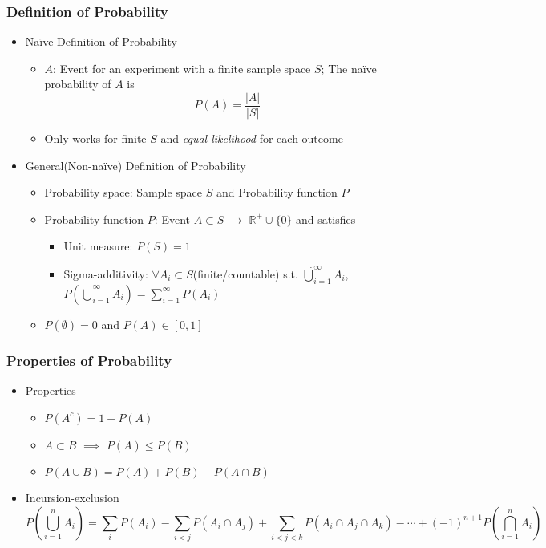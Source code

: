\subsubsection*{Definition of Probability}
\begin{itemize}
    \item Na\"ive Definition of Probability
    \begin{itemize}
        \item $A$: Event for an experiment with a finite sample space $S$; The na\"ive probability of $A$ is
        \begin{equation}
            P(A)=\frac{|A|}{|S|}
        \end{equation}
        \item Only works for finite $S$ and \textit{equal likelihood} for each outcome
    \end{itemize}
    \item General(Non-na\"ive) Definition of Probability
    \begin{itemize}
        \item Probability space: Sample space $S$ and Probability function $P$
        \item Probability function $P$: Event $A\subset S$ $\to$ $\mathbb{R}^+\cup\{0\}$ and satisfies
        \begin{itemize}
            \item Unit measure: $P(S)=1$
            \item Sigma-additivity: $\forall A_i\subset S$(finite/countable) s.t. $\dot\bigcup_{i=1}^\infty A_i$, $P\left(\dot\bigcup_{i=1}^\infty A_i\right)=\sum_{i=1}^\infty P(A_i)$
        \end{itemize}
        \item $P(\emptyset)=0$ and $P(A)\in[0,1]$
    \end{itemize}
\end{itemize}

\subsubsection*{Properties of Probability}
\begin{itemize}
    \item Properties
    \begin{itemize}
        \item $P(A^c)=1-P(A)$
        \item $A\subset B$ $\implies$ $P(A)\leq P(B)$
        \item $P(A\cup B)=P(A)+P(B)-P(A\cap B)$
    \end{itemize}
    \item Incursion-exclusion
    \begin{equation}
        P\left(\bigcup_{i=1}^nA_i\right)=\sum_iP(A_i)-\sum_{i<j}P(A_i\cap A_j)+\sum_{i<j<k}P(A_i\cap A_j\cap A_k)-\cdots+(-1)^{n+1}P\left(\bigcap_{i=1}^nA_i\right)
    \end{equation}
\end{itemize}
